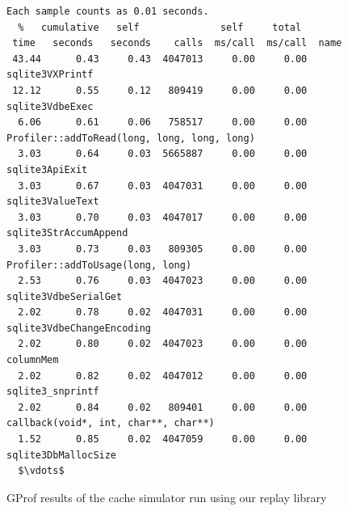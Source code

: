 \begin{figure}
  \lstset{basicstyle=\footnotesize, mathescape=true}
  \begin{lstlisting}
Each sample counts as 0.01 seconds.
  %   cumulative   self              self     total           
 time   seconds   seconds    calls  ms/call  ms/call  name    
 43.44      0.43     0.43  4047013     0.00     0.00  sqlite3VXPrintf
 12.12      0.55     0.12   809419     0.00     0.00  sqlite3VdbeExec
  6.06      0.61     0.06   758517     0.00     0.00  Profiler::addToRead(long, long, long, long)
  3.03      0.64     0.03  5665887     0.00     0.00  sqlite3ApiExit
  3.03      0.67     0.03  4047031     0.00     0.00  sqlite3ValueText
  3.03      0.70     0.03  4047017     0.00     0.00  sqlite3StrAccumAppend
  3.03      0.73     0.03   809305     0.00     0.00  Profiler::addToUsage(long, long)
  2.53      0.76     0.03  4047023     0.00     0.00  sqlite3VdbeSerialGet
  2.02      0.78     0.02  4047031     0.00     0.00  sqlite3VdbeChangeEncoding
  2.02      0.80     0.02  4047023     0.00     0.00  columnMem
  2.02      0.82     0.02  4047012     0.00     0.00  sqlite3_snprintf
  2.02      0.84     0.02   809401     0.00     0.00  callback(void*, int, char**, char**)
  1.52      0.85     0.02  4047059     0.00     0.00  sqlite3DbMallocSize
  $\vdots$
  \end{lstlisting}
 
  \caption{GProf results of the cache simulator run using our replay library}
  \label{fig:profile}
\end{figure}
